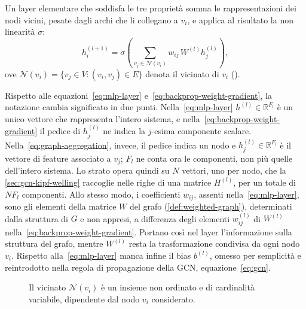 Un layer elementare che soddisfa le tre proprietà somma le rappresentazioni dei nodi vicini, pesate dagli archi che li collegano a $v_i$, e applica al risultato la non linearità $\sigma$:
\begin{equation}
\label{eq:graph-aggregation}
h_i^{(l+1)} = \sigma\!\left(\sum_{v_j \in \mathcal{N}(v_i)} w_{ij}\, W^{(l)} h_j^{(l)}\right),
\end{equation}
ove $\mathcal{N}(v_i) = \{v_j \in V : (v_i,v_j)\in E\}$ denota il vicinato di $v_i$ ().

Rispetto alle equazioni~\eqref{eq:mlp-layer} e~\eqref{eq:backprop-weight-gradient}, la notazione cambia significato in due punti. Nella~\eqref{eq:mlp-layer} $h^{(l)}\in\mathbb{R}^{F_l}$ è un unico vettore che rappresenta l'intero sistema, e nella~\eqref{eq:backprop-weight-gradient} il pedice di $h^{(l)}_j$ ne indica la $j$-esima componente scalare. Nella~\eqref{eq:graph-aggregation}, invece, il pedice indica un nodo e $h_j^{(l)}\in\mathbb{R}^{F_l}$ è il vettore di feature associato a $v_j$; $F_l$ ne conta ora le componenti, non più quelle dell'intero sistema. Lo strato opera quindi su $N$ vettori, uno per nodo, che la \cref{sec:gcn-kipf-welling} raccoglie nelle righe di una matrice $H^{(l)}$, per un totale di $NF_l$ componenti. Allo stesso modo, i coefficienti $w_{ij}$, assenti nella~\eqref{eq:mlp-layer}, sono gli elementi della matrice $W$ del grafo (\cref{def:weighted-graph}), determinati dalla struttura di $G$ e non appresi, a differenza degli elementi $w^{(l)}_{ij}$ di $W^{(l)}$ nella~\eqref{eq:backprop-weight-gradient}. Portano così nel layer l'informazione sulla struttura del grafo, mentre $W^{(l)}$ resta la trasformazione condivisa da ogni nodo $v_i$. Rispetto alla~\eqref{eq:mlp-layer} manca infine il bias $b^{(l)}$, omesso per semplicità e reintrodotto nella regola di propagazione della GCN, equazione~\eqref{eq:gcn}.

\begin{figure}[H]
\centering
{}
\caption[Vicinato di un nodo su un grafo]{Il vicinato $\mathcal{N}(v_i)$ è un insieme non ordinato e di cardinalità variabile, dipendente dal nodo $v_i$ considerato.}
\label{fig:graph-neighborhood}
\end{figure}

